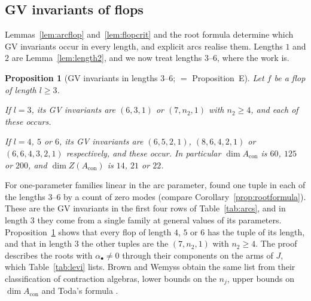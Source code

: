 \documentclass[11pt]{amsart}
\numberwithin{table}{section}
\numberwithin{figure}{section}
\numberwithin{equation}{section}
\newtheorem{prop}[thm]{Proposition}
\theoremstyle{definition}
\theoremstyle{plain}
\newcommand{\Acon}{A_{\mathrm{con}}}
\newcommand{\bul}{\bullet}
\begin{document}
\subsection{GV invariants of flops}\label{ss:typeE}

Lemmas~\ref{lem:arcflop} and~\ref{lem:flopcrit} and the root formula determine which GV invariants occur in every length, and explicit arcs realise them. Lengths $1$ and $2$ are Lemma~\ref{lem:length2}, and we now treat lengths $3$--$6$, where the work is.

\begin{prop}[GV invariants in lengths 3--6; $=$ Proposition~E]\label{prop:typeE}
Let $f$ be a flop of length $l \ge 3$.
\begin{thmlist}
\item If $l = 3$, its GV invariants are $(6, 3, 1)$ or $(7, n_2, 1)$ with $n_2 \ge 4$, and each of these occurs.
\item If $l = 4$, $5$ or $6$, its GV invariants are $(6, 5, 2, 1)$, $(8, 6, 4, 2, 1)$ or $(6, 6, 4, 3, 2, 1)$ respectively, and these occur. In particular $\dim \Acon$ is $60$, $125$ or $200$, and $\dim Z(\Acon)$ is $14$, $21$ or $22$.
\end{thmlist}
\end{prop}

For one-parameter families linear in the arc parameter, \cite[\S\S4.3--4.6]{CDSV} found one tuple in each of the lengths $3$--$6$ by a count of zero modes (compare Corollary~\ref{prop:rootformula}). These are the GV invariants in the first four rows of Table~\ref{tab:arcs}, and in length $3$ they come from a single family at general values of its parameters. Proposition~\ref{prop:typeE} shows that every flop of length $4$, $5$ or $6$ has the tuple of its length, and that in length $3$ the other tuples are the $(7, n_2, 1)$ with $n_2 \ge 4$. The proof describes the roots with $\alpha_\bul \neq 0$ through their components on the arms of $J$, which Table~\ref{tab:levi} lists. Brown and Wemyss obtain the same list from their classification of contraction algebras, lower bounds on the $n_j$, upper bounds on $\dim \Acon$ and Toda's formula \cite[Cor~1.6]{BW26}.
\end{document}
